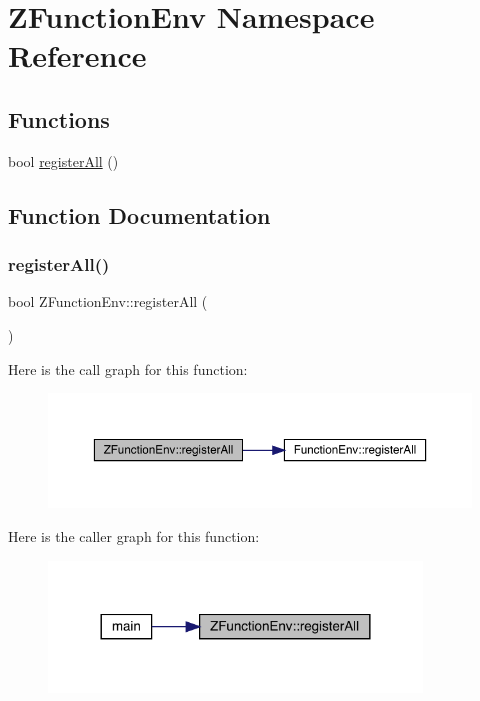 \hypertarget{namespaceZFunctionEnv}{}\section{Z\+Function\+Env Namespace Reference}
\label{namespaceZFunctionEnv}
\subsection*{Functions}
\begin{DoxyCompactItemize}
\item 
bool \mbox{\hyperlink{namespaceZFunctionEnv_aa085f0e74705bcd7d2ce1c01ca0da42a}{register\+All}} ()
\end{DoxyCompactItemize}


\subsection{Function Documentation}
\mbox{\label{namespaceZFunctionEnv_aa085f0e74705bcd7d2ce1c01ca0da42a}} 
\subsubsection{\texorpdfstring{registerAll()}{registerAll()}}
{\footnotesize\ttfamily bool Z\+Function\+Env\+::register\+All (\begin{DoxyParamCaption}{ }\end{DoxyParamCaption})}

Here is the call graph for this function\+:
\nopagebreak
\begin{figure}[H]
\begin{center}
\leavevmode
\includegraphics[width=350pt]{d4/d52/namespaceZFunctionEnv_aa085f0e74705bcd7d2ce1c01ca0da42a_cgraph}
\end{center}
\end{figure}
Here is the caller graph for this function\+:
\nopagebreak
\begin{figure}[H]
\begin{center}
\leavevmode
\includegraphics[width=281pt]{d4/d52/namespaceZFunctionEnv_aa085f0e74705bcd7d2ce1c01ca0da42a_icgraph}
\end{center}
\end{figure}
